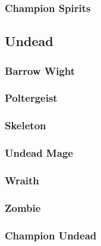 \subsubsection{Champion Spirits}

\subsection{Undead}
\begin{multicols}{2}
    \subsubsection*{Barrow Wight}\label{foe:barrow-wight}
    \subsubsection*{Poltergeist}\label{foe:poltergeist}
    \subsubsection*{Skeleton}\label{foe:skeleton}
    \subsubsection*{Undead Mage}\label{foe:undead-mage}
    \subsubsection*{Wraith}\label{foe:wraith}
    \subsubsection*{Zombie}\label{foe:zombie}
\end{multicols}
\subsubsection{Champion Undead}
